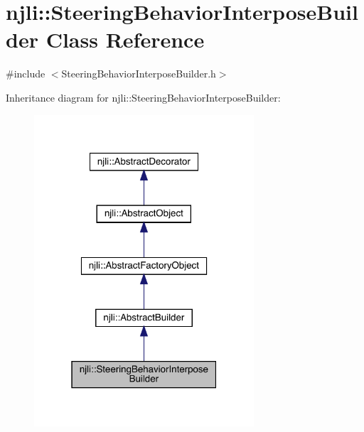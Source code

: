 \hypertarget{classnjli_1_1_steering_behavior_interpose_builder}{}\section{njli\+:\+:Steering\+Behavior\+Interpose\+Builder Class Reference}
\label{classnjli_1_1_steering_behavior_interpose_builder}


{\ttfamily \#include $<$Steering\+Behavior\+Interpose\+Builder.\+h$>$}



Inheritance diagram for njli\+:\+:Steering\+Behavior\+Interpose\+Builder\+:\nopagebreak
\begin{figure}[H]
\begin{center}
\leavevmode
\includegraphics[width=232pt]{classnjli_1_1_steering_behavior_interpose_builder__inherit__graph}
\end{center}
\end{figure}



